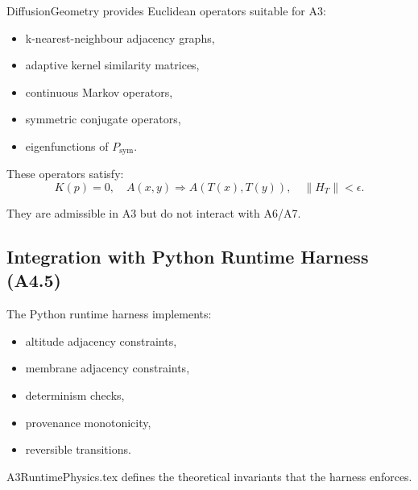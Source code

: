 DiffusionGeometry provides Euclidean operators suitable for A3:
\begin{itemize}
  \item k-nearest-neighbour adjacency graphs,
  \item adaptive kernel similarity matrices,
  \item continuous Markov operators,
  \item symmetric conjugate operators,
  \item eigenfunctions of $P_{\mathrm{sym}}$.
\end{itemize}

These operators satisfy:
\[
K(p) = 0, \quad A(x,y) \Rightarrow A(T(x),T(y)), \quad \|H_T\| < \epsilon.
\]

They are admissible in A3 but do not interact with A6/A7.

\subsection{Integration with Python Runtime Harness (A4.5)}

The Python runtime harness implements:
\begin{itemize}
  \item altitude adjacency constraints,
  \item membrane adjacency constraints,
  \item determinism checks,
  \item provenance monotonicity,
  \item reversible transitions.
\end{itemize}

A3RuntimePhysics.tex defines the theoretical invariants that the harness enforces.


